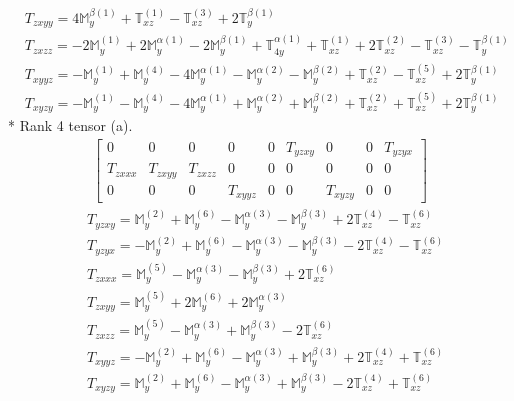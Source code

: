 \documentclass[fleqn,8pt,landscape]{jsarticle}
\begin{document}
\begin{align*}
& T_{zxyy} = 4 \mathbb{M}_{y}^{\beta(1)} + \mathbb{T}_{xz}^{(1)} - \mathbb{T}_{xz}^{(3)} + 2 \mathbb{T}_{y}^{\beta(1)} \\
& T_{zxzz} = - 2 \mathbb{M}_{y}^{(1)} + 2 \mathbb{M}_{y}^{\alpha(1)} - 2 \mathbb{M}_{y}^{\beta(1)} + \mathbb{T}_{4y}^{\alpha(1)} + \mathbb{T}_{xz}^{(1)} + 2 \mathbb{T}_{xz}^{(2)} - \mathbb{T}_{xz}^{(3)} - \mathbb{T}_{y}^{\beta(1)} \\
& T_{xyyz} = - \mathbb{M}_{y}^{(1)} + \mathbb{M}_{y}^{(4)} - 4 \mathbb{M}_{y}^{\alpha(1)} - \mathbb{M}_{y}^{\alpha(2)} - \mathbb{M}_{y}^{\beta(2)} + \mathbb{T}_{xz}^{(2)} - \mathbb{T}_{xz}^{(5)} + 2 \mathbb{T}_{y}^{\beta(1)} \\
& T_{xyzy} = - \mathbb{M}_{y}^{(1)} - \mathbb{M}_{y}^{(4)} - 4 \mathbb{M}_{y}^{\alpha(1)} + \mathbb{M}_{y}^{\alpha(2)} + \mathbb{M}_{y}^{\beta(2)} + \mathbb{T}_{xz}^{(2)} + \mathbb{T}_{xz}^{(5)} + 2 \mathbb{T}_{y}^{\beta(1)}
\end{align*}
* Rank 4 tensor (a).
\begin{align*}
\begin{bmatrix} 0 & 0 & 0 & 0 & 0 & T_{yzxy} & 0 & 0 & T_{yzyx} \\ T_{zxxx} & T_{zxyy} & T_{zxzz} & 0 & 0 & 0 & 0 & 0 & 0 \\ 0 & 0 & 0 & T_{xyyz} & 0 & 0 & T_{xyzy} & 0 & 0 \end{bmatrix}
\end{align*}
\begin{align*}
& T_{yzxy} = \mathbb{M}_{y}^{(2)} + \mathbb{M}_{y}^{(6)} - \mathbb{M}_{y}^{\alpha(3)} - \mathbb{M}_{y}^{\beta(3)} + 2 \mathbb{T}_{xz}^{(4)} - \mathbb{T}_{xz}^{(6)} \\
& T_{yzyx} = - \mathbb{M}_{y}^{(2)} + \mathbb{M}_{y}^{(6)} - \mathbb{M}_{y}^{\alpha(3)} - \mathbb{M}_{y}^{\beta(3)} - 2 \mathbb{T}_{xz}^{(4)} - \mathbb{T}_{xz}^{(6)} \\
& T_{zxxx} = \mathbb{M}_{y}^{(5)} - \mathbb{M}_{y}^{\alpha(3)} - \mathbb{M}_{y}^{\beta(3)} + 2 \mathbb{T}_{xz}^{(6)} \\
& T_{zxyy} = \mathbb{M}_{y}^{(5)} + 2 \mathbb{M}_{y}^{(6)} + 2 \mathbb{M}_{y}^{\alpha(3)} \\
& T_{zxzz} = \mathbb{M}_{y}^{(5)} - \mathbb{M}_{y}^{\alpha(3)} + \mathbb{M}_{y}^{\beta(3)} - 2 \mathbb{T}_{xz}^{(6)} \\
& T_{xyyz} = - \mathbb{M}_{y}^{(2)} + \mathbb{M}_{y}^{(6)} - \mathbb{M}_{y}^{\alpha(3)} + \mathbb{M}_{y}^{\beta(3)} + 2 \mathbb{T}_{xz}^{(4)} + \mathbb{T}_{xz}^{(6)} \\
& T_{xyzy} = \mathbb{M}_{y}^{(2)} + \mathbb{M}_{y}^{(6)} - \mathbb{M}_{y}^{\alpha(3)} + \mathbb{M}_{y}^{\beta(3)} - 2 \mathbb{T}_{xz}^{(4)} + \mathbb{T}_{xz}^{(6)}
\end{align*}
\end{document}
